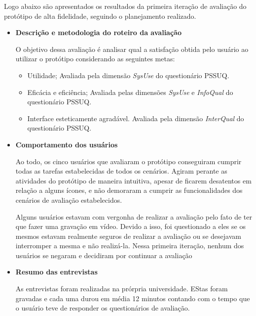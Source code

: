       Logo abaixo são apresentados os resultados da primeira iteração de avaliação do protótipo de alta fidelidade,
      seguindo o planejamento realizado.
      
      \begin{itemize}
       \item \textbf{Descrição e metodologia do roteiro da avaliação}
       
       \subitem O objetivo dessa avaliação é analisar qual a satisfação obtida pelo usuário ao utilizar o protótipo 
        considerando as seguintes metas:
       
	\begin{itemize}
	  \item Utilidade;
	    \subitem Avaliada pela dimensão \textit{SysUse} do questionário PSSUQ.
	    
	  \item Eficácia e eficiência;
	    \subitem Avaliada pelas dimensões \textit{SysUse} e \textit{InfoQual} do questionário PSSUQ.
	    
	  \item Interface esteticamente agradável.
	    \subitem Avaliada pela dimensão \textit{InterQual} do questionário PSSUQ.
	\end{itemize}
       
       \item \textbf{Comportamento dos usuários}
       
	  \subitem Ao todo, os cinco usuários que avaliaram o protótipo conseguiram cumprir todas as tarefas estabelecidas 
	  de todos os cenários. Agiram perante as atividades do protótipo de maneira intuitiva, apesar de ficarem 
	  desatentos em relação a alguns ícones, e não demoraram a cumprir as funcionalidades dos cenários de avaliação 
	  estabelecidos. 
	  
	  \subitem Alguns usuários estavam com vergonha de realizar a avaliação pelo fato de ter que fazer uma gravação em vídeo. 
	  Devido a isso, foi questionado a eles se os mesmos estavam realmente seguros de realizar a avaliação ou se desejavam 
	  interromper a mesma e não realizá-la. Nessa primeira iteração, nenhum dos usuários se negaram e decidiram por 
	  continuar a avaliação
       
       \item \textbf{Resumo das entrevistas}
       
	  \subitem As entrevistas foram realizadas na prórpria universidade. EStas foram gravadas e cada uma durou em 
	  média 12 minutos contando com o tempo que o usuário teve de responder os questionários de avaliação.
	        

\end{itemize}
